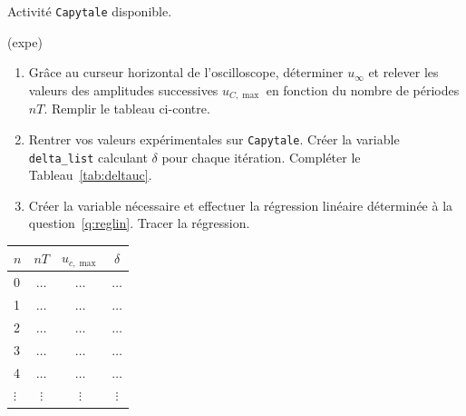 \documentclass[../main/main.tex]{subfiles}
\begin{document}
Activité \texttt{Capytale} disponible.
\begin{tcb}(expe){}
	\begin{isd}[righthand ratio=.35]
		\begin{enumerate}
			\item Grâce au curseur horizontal de l'oscilloscope, déterminer
			      $u_{\infty}$ et relever les valeurs des amplitudes successives
			      $u_{C,\max}$ en fonction du nombre de périodes $nT$. Remplir le
			      tableau ci-contre.
			\item Rentrer vos valeurs expérimentales sur \texttt{Capytale}.
			      Créer la variable \texttt{delta\_list} calculant $\delta$ pour
			      chaque itération. Compléter le Tableau~\ref{tab:deltauc}.
			\item Créer la variable nécessaire et effectuer la régression linéaire
			      déterminée à la question~\ref{q:reglin}. Tracer la régression.
		\end{enumerate}
		\tcblower
		\begin{center}
			\label{tab:deltauc}
			\begin{tabular}{lccc}
				\toprule
				$n$      & $nT$     & $u_{c, \max}$ & $\delta $ \\
				\midrule
				0        & $\ldots$ & $\ldots$      & $\ldots$  \\
				1        & $\ldots$ & $\ldots$      & $\ldots$  \\
				2        & $\ldots$ & $\ldots$      & $\ldots$  \\
				3        & $\ldots$ & $\ldots$      & $\ldots$  \\
				4        & $\ldots$ & $\ldots$      & $\ldots$  \\
				$\vdots$ & $\vdots$ & $\vdots$      & $\vdots$  \\
				\bottomrule
			\end{tabular}
		\end{center}
	\end{isd}

\end{tcb}

\end{document}
